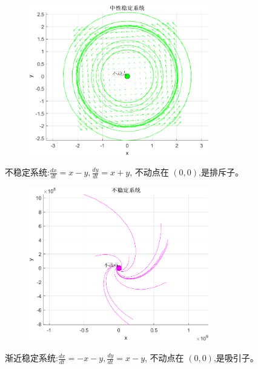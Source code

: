 \begin{figure}[H]
    \centering
    \includegraphics[width=0.7\textwidth]{Img/fix4.png}
    \label{fig:neutral_stable}
\end{figure}
不稳定系统:$\frac{dx}{dt}=x-y,\frac{dy}{dt}=x+y$, 不动点在 $(0, 0)$,是排斥子。
\begin{figure}[H]
    \centering
    \includegraphics[width=0.7\textwidth]{Img/fix2.png}
    \label{fig:unstable}
\end{figure}
渐近稳定系统:$\frac{dx}{dt}=-x-y,\frac{dy}{dt}=x-y$, 不动点在 $(0, 0)$,是吸引子。

